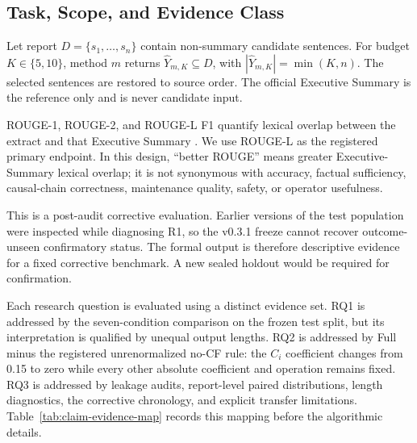 \documentclass[applsci,article,submit,moreauthors]{Definitions/mdpi}
\begin{document}
\subsection{Task, Scope, and Evidence Class}

Let report $D=\{s_1,\ldots,s_n\}$ contain non-summary candidate sentences. For budget $K\in\{5,10\}$, method $m$ returns $\hat{Y}_{m,K}\subseteq D$, with $|\hat{Y}_{m,K}|=\min(K,n)$. The selected sentences are restored to source order. The official Executive Summary is the reference only and is never candidate input.

ROUGE-1, ROUGE-2, and ROUGE-L F1 quantify lexical overlap between the extract and that Executive Summary \cite{lin2004rouge}. We use ROUGE-L as the registered primary endpoint. In this design, ``better ROUGE'' means greater Executive-Summary lexical overlap; it is not synonymous with accuracy, factual sufficiency, causal-chain correctness, maintenance quality, safety, or operator usefulness.

This is a post-audit corrective evaluation. Earlier versions of the test population were inspected while diagnosing R1, so the v0.3.1 freeze cannot recover outcome-unseen confirmatory status. The formal output is therefore descriptive evidence for a fixed corrective benchmark. A new sealed holdout would be required for confirmation.

Each research question is evaluated using a distinct evidence set. RQ1 is addressed by the seven-condition comparison on the frozen test split, but its interpretation is qualified by unequal output lengths. RQ2 is addressed by Full minus the registered unrenormalized no-CF rule: the $C_i$ coefficient changes from 0.15 to zero while every other absolute coefficient and operation remains fixed. RQ3 is addressed by leakage audits, report-level paired distributions, length diagnostics, the corrective chronology, and explicit transfer limitations. Table~\ref{tab:claim-evidence-map} records this mapping before the algorithmic details.
\end{document}
